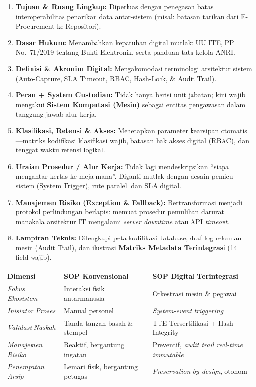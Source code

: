\documentclass[11pt,a4paper]{article}
\begin{document}
\begin{enumerate}
    \item \textbf{Tujuan \& Ruang Lingkup:} Diperluas dengan penegasan batas interoperabilitas penarikan data antar-sistem (misal: batasan tarikan dari E-Procurement ke Repositori).
    \item \textbf{Dasar Hukum:} Menambahkan kepatuhan digital mutlak: UU ITE, PP No.~71/2019 tentang Bukti Elektronik, serta panduan tata kelola ANRI.
    \item \textbf{Definisi \& Akronim Digital:} Mengakomodasi terminologi arsitektur sistem (Auto-Capture, SLA Timeout, RBAC, Hash-Lock, \& Audit Trail).
    \item \textbf{Peran + System Custodian:} Tidak hanya berisi unit jabatan; kini wajib mengakui \textbf{Sistem Komputasi (Mesin)} sebagai entitas pengawasan dalam tanggung jawab alur kerja.
    \item \textbf{Klasifikasi, Retensi \& Akses:} Menetapkan parameter kearsipan otomatis---matriks kodifikasi klasifikasi wajib, batasan hak akses digital (RBAC), dan tenggat waktu retensi logikal.
    \item \textbf{Uraian Prosedur / Alur Kerja:} Tidak lagi mendeskripsikan ``siapa mengantar kertas ke meja mana''. Diganti mutlak dengan desain pemicu sistem (System Trigger), rute paralel, dan SLA digital.
    \item \textbf{Manajemen Risiko (Exception \& Fallback):} Bertransformasi menjadi protokol perlindungan berlapis: memuat prosedur pemulihan darurat manakala arsitektur IT mengalami \textit{server downtime} atau API \textit{timeout}.
    \item \textbf{Lampiran Teknis:} Dilengkapi peta kodifikasi database, draf log rekaman mesin (Audit Trail), dan ilustrasi \textbf{Matriks Metadata Terintegrasi} (14 field wajib).
\end{enumerate}

\begin{casebox}
\small
\begin{tabularx}{\textwidth}{@{} p{3.6cm} X X @{}}
\toprule
\textbf{Dimensi} & \textbf{SOP Konvensional} & \textbf{SOP Digital Terintegrasi} \\
\midrule
\textit{Fokus Ekosistem} & Interaksi fisik antarmanusia & Orkestrasi mesin \& pegawai \\
\textit{Inisiator Proses} & Manual personel & \textit{System-event triggering} \\
\textit{Validasi Naskah} & Tanda tangan basah \& stempel & TTE Tersertifikasi + Hash Integrity \\
\textit{Manajemen Risiko} & Reaktif, bergantung ingatan & Preventif, \textit{audit trail real-time immutable} \\
\textit{Penempatan Arsip} & Lemari fisik, bergantung petugas & \textit{Preservation by design}, otonom \\
\bottomrule
\end{tabularx}
\end{casebox}
\end{document}

